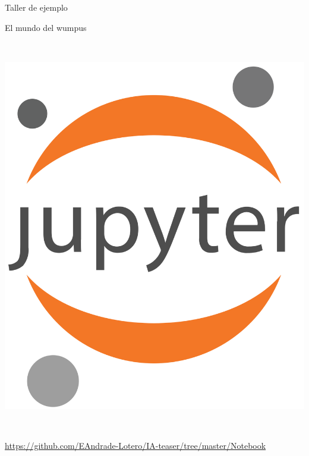 \documentclass[11pt]{beamer}
\begin{document}
\begin{frame}{Taller de ejemplo}

\begin{center}
El mundo del wumpus

\

\includegraphics[scale=.05]{imagenes/Jupyter_logo}

\

\url{https://github.com/EAndrade-Lotero/IA-teaser/tree/master/Notebook}
\end{center}

\end{frame}
\end{document}
